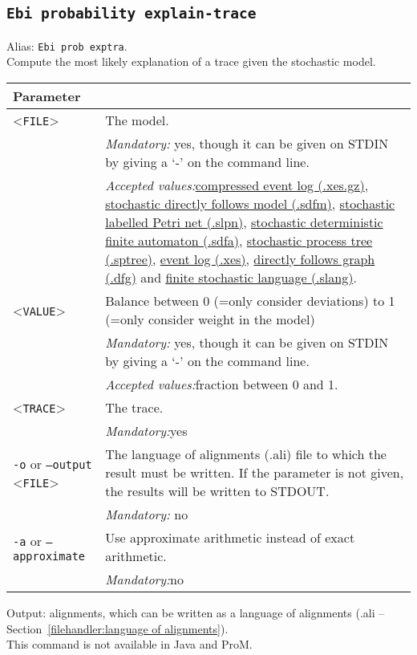 {\subsection{\texttt{Ebi probability explain-trace}}
\label{command:Ebi probability explain-trace}
Alias: \texttt{Ebi prob exptra}.\\
Compute the most likely explanation of a trace given the stochastic model.\\
\begin{tabularx}{\linewidth}{lX}
\toprule
Parameter \\\midrule
<\texttt{FILE}>&The model.\\
&\textit{Mandatory:} \quad yes, though it can be given on STDIN by giving a `-' on the command line.\\
&\textit{Accepted values:}\quad \hyperref[filehandler:compressed event log]{compressed event log (.xes.gz)}, \hyperref[filehandler:stochastic directly follows model]{stochastic directly follows model (.sdfm)}, \hyperref[filehandler:stochastic labelled Petri net]{stochastic labelled Petri net (.slpn)}, \hyperref[filehandler:stochastic deterministic finite automaton]{stochastic deterministic finite automaton (.sdfa)}, \hyperref[filehandler:stochastic process tree]{stochastic process tree (.sptree)}, \hyperref[filehandler:event log]{event log (.xes)}, \hyperref[filehandler:directly follows graph]{directly follows graph (.dfg)} and \hyperref[filehandler:finite stochastic language]{finite stochastic language (.slang)}.\\
<\texttt{VALUE}>&Balance between 0 (=only consider deviations) to 1 (=only consider weight in the model)\\
&\textit{Mandatory:} \quad yes, though it can be given on STDIN by giving a `-' on the command line.\\
&\textit{Accepted values:}\quad fraction between 0 and 1.\\
<\texttt{TRACE}>
&The trace.\\
&\textit{Mandatory:}\quad yes\\
\texttt{-o} or \texttt{--output} <\texttt{FILE}> &
The language of alignments (.ali) file to which the result must be written. If the parameter is not given, the results will be written to STDOUT.\\
&\textit{Mandatory:} \quad no\\
\texttt{-a} or \texttt{--approximate} & Use approximate arithmetic instead of exact arithmetic.\\
&\textit{Mandatory:}\quad no\\
\bottomrule
\end{tabularx}
\noindent Output: alignments, which can be written as a language of alignments (.ali -- Section~\ref{filehandler:language of alignments}).
\\This command is not available in Java and ProM.
}
